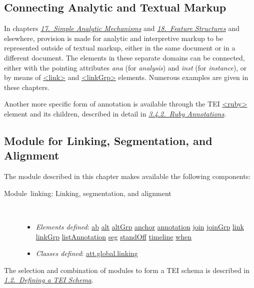 \subsection[{Connecting Analytic and Textual Markup}]{Connecting Analytic and Textual Markup}\label{SAAN}\par
In chapters \textit{\hyperref[AI]{17.\ Simple Analytic Mechanisms}} and \textit{\hyperref[FS]{18.\ Feature Structures}} and elsewhere, provision is made for analytic and interpretive markup to be represented outside of textual markup, either in the same document or in a different document. The elements in these separate domains can be connected, either with the pointing attributes {\itshape ana} (for \textit{analysis}) and {\itshape inst} (for \textit{instance}), or by means of \hyperref[TEI.link]{<link>} and \hyperref[TEI.linkGrp]{<linkGrp>} elements. Numerous examples are given in these chapters.\par
Another more specific form of annotation is available through the TEI \hyperref[TEI.ruby]{<ruby>} element and its children, described in detail in \textit{\hyperref[COHTGRB]{3.4.2.\ Ruby Annotations}}.
\subsection[{Module for Linking, Segmentation, and Alignment}]{Module for Linking, Segmentation, and Alignment}\label{SAref}\par
The module described in this chapter makes available the following components: \begin{description}

\item[{Module linking: Linking, segmentation, and alignment}]\hspace{1em}\hfill\linebreak
\mbox{}\\[-10pt] \begin{itemize}
\item {\itshape Elements defined}: \hyperref[TEI.ab]{ab} \hyperref[TEI.alt]{alt} \hyperref[TEI.altGrp]{altGrp} \hyperref[TEI.anchor]{anchor} \hyperref[TEI.annotation]{annotation} \hyperref[TEI.join]{join} \hyperref[TEI.joinGrp]{joinGrp} \hyperref[TEI.link]{link} \hyperref[TEI.linkGrp]{linkGrp} \hyperref[TEI.listAnnotation]{listAnnotation} \hyperref[TEI.seg]{seg} \hyperref[TEI.standOff]{standOff} \hyperref[TEI.timeline]{timeline} \hyperref[TEI.when]{when}
\item {\itshape Classes defined}: \hyperref[TEI.att.global.linking]{att.global.linking}
\end{itemize} 
\end{description}  The selection and combination of modules to form a TEI schema is described in \textit{\hyperref[STIN]{1.2.\ Defining a TEI Schema}}.